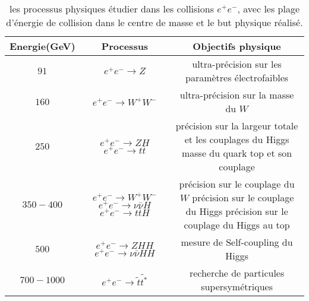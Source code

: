 \begin{table}[H]
  \small
  \centering
  \begin{tabular}{c c c}
    \hline 
    Energie(GeV) & Processus & Objectifs physique\\
    \hline 
    $91$ & $e^{+}e^{-}{\rightarrow}Z$ &  ultra-pr\'ecision sur les param\`etres \'electrofaibles \\
    \hline 
    $160$ & $e^{+}e^{-}{\rightarrow}W^{+}W^{-}$ & ultra-pr\'ecision sur la masse du $W$ \\
    \hline 
    $250$ & \pbox{20cm}{$e^{+}e^{-}{\rightarrow}ZH$\\$e^{+}e^{-}{\rightarrow}t\bar{t}$}  & \pbox{20cm}{pr\'ecision sur la largeur totale et les couplages du Higgs\\masse du quark top et son couplage}\rule[-7pt]{0pt}{20pt}\\
    \hline 
    $350-400$ & \pbox{20cm}{$e^{+}e^{-}{\rightarrow}W^+W^-$\\$e^{+}e^{-}{\rightarrow}\nu\bar{\nu}H$\\$e^{+}e^{-}{\rightarrow}t\bar{t}H$} & \pbox{20cm}{pr\'ecision sur le couplage du $W$\\pr\'ecision sur le couplage du Higgs\\pr\'ecision sur le couplage du Higgs au top}\rule[-7pt]{0pt}{20pt}\\
    \hline 
    $500$ & \pbox{20cm}{$e^{+}e^{-}{\rightarrow}ZHH$\\$e^{+}e^{-}{\rightarrow}{\nu}\bar{\nu}HH$} & mesure de Self-coupling du Higgs\rule[-10pt]{0pt}{20pt}\\
    \hline 
    $700-1000$ & $e^{+}e^{-}{\rightarrow}\tilde{t}\tilde{t^*}$ & recherche de particules supersym\'etriques\rule[-7pt]{0pt}{20pt}\\
    \hline    
  \end{tabular}
  \caption{les processus physiques \'etudier dans les collisions $e^{+}e^{-}$, avec les plage d'\'energie de collision dans le centre de masse et le but physique r\'ealis\'e.}
  \label{table:2.2}
\end{table}

